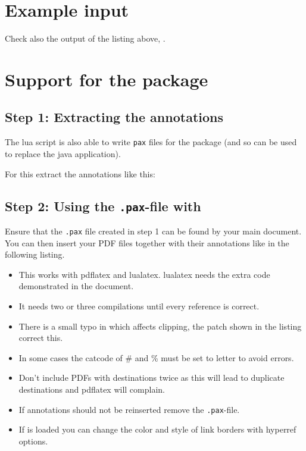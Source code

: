 \documentclass[DIV=12,parskip=half-,bibliography=totoc]{scrartcl}
\begin{document}
\section{Example input}


Check also the output of the listing above, .

\section{Support for the \texorpdfstring{}{pax} package}

\subsection{Step 1: Extracting the annotations}
The lua script is also able to write \texttt{pax} files for the  package (and so can be used to replace the java application).

For this extract the annotations like this:



\subsection{Step 2: Using the \texttt{.pax}-file with }

Ensure that the \texttt{.pax} file created in step 1 can be found by your main document. You can then insert your PDF files together with their annotations like in the following listing.

\begin{itemize}
\item This works with pdflatex and lualatex. lualatex needs the extra code demonstrated in the document.
\item It needs two or three compilations until every reference is correct.
\item There is a small typo in  which affects clipping, the patch shown in the listing correct this.
\item In some cases the catcode of \# and \% must be set to letter to avoid errors.
\item Don't include PDFs with destinations twice as this will lead to duplicate destinations and pdflatex will complain.
\item If annotations should not be reinserted remove the \texttt{.pax}-file.
\item If  is loaded you can change the color and style of link borders with hyperref options.
\end{itemize}
\enlargethispage{\baselineskip}

\end{document}
